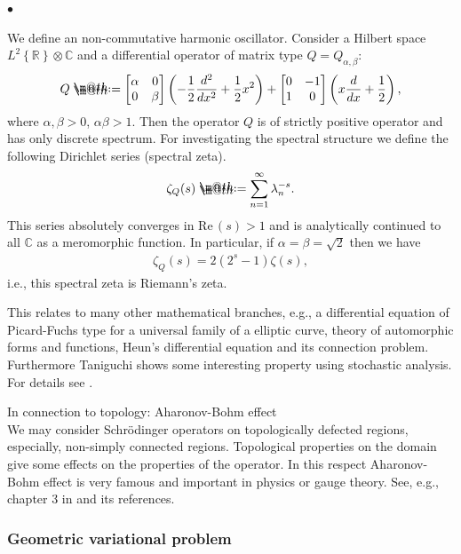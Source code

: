 \documentclass[openany, a4paper, oneside]{jsbook}
\makeatletter
\newcounter{enum2}
\renewenvironment{itemize}{%
\begin{list}{$\bullet$\ \ }%
{%
\usecounter{enum2}
\setlength{\itemindent}{0pt}%
\setlength{\leftmargin}{15pt}%
\setlength{\rightmargin}{0pt}%
\setlength{\labelsep}{0pt}%
\setlength{\labelwidth}{6pt}%
\setlength{\itemsep}{0pt}%
\setlength{\parsep}{0pt}%
\setlength{\listparindent}{0pt}%
}
}{%
\end{list}%
}
\newcommand*{\defeq}{\mathrel{\rlap{%
\raisebox{0.3ex}{$\m@th\cdot$}}%
\raisebox{-0.3ex}{$\m@th\cdot$}}%
=}
\theoremstyle{break}
\theoremstyle{breakdefn}
\renewcommand{\Re}{\mathrm{Re} \,}
\newcommand{\rbk}[1]{\left (#1\right)}
\newcommand{\cbk}[1]{\left\{#1\right\}}
\newcommand{\bbC}{\mathbb{C}}
\newcommand{\bbR}{\mathbb{R}}
\makeatother
\begin{document}
\begin{itemize}
We define an non-commutative harmonic oscillator.
Consider a Hilbert space $L^2 \cbk{\bbR} \otimes \bbC$ and
a differential operator of matrix type $Q = Q_{\alpha, \beta}$:
\begin{align}
 Q
 \defeq
 \begin{bmatrix}
  \alpha & 0 \\
  0      & \beta
 \end{bmatrix}
 \rbk{- \frac{1}{2} \frac{d^2}{dx^2} + \frac{1}{2} x^2} +
 \begin{bmatrix}
  0 & -1 \\
  1 & 0
 \end{bmatrix}
 \rbk{x \frac{d}{dx} + \frac{1}{2}},
\end{align}
where $\alpha, \beta > 0$, $\alpha \beta > 1$.
Then the operator $Q$ is of strictly positive operator and has only discrete spectrum.
For investigating the spectral structure we define the following Dirichlet series (spectral zeta).
\begin{align}
 \zeta_{Q} (s)
 \defeq
 \sum_{n=1}^{\infty} \lambda_{n}^{-s}.
\end{align}
This series absolutely converges in $\Re \rbk{s} > 1$ and
is analytically continued to all $\bbC$ as a meromorphic function.
In particular, if $\alpha = \beta = \sqrt{2}$ then we have
\begin{align}
 \zeta_{Q} (s)
 =
 2 \rbk{2^s - 1} \zeta (s),
\end{align}
i.e., this spectral zeta is Riemann's zeta.

This relates to many other mathematical branches, e.g.,
a differential equation of Picard-Fuchs type  for a universal family of a elliptic curve,
theory of automorphic forms and functions,
Heun's differential equation and its connection problem.
Furthermore Taniguchi shows some interesting property using stochastic analysis.
For details see \cite{AlbertoParmeggiani1}.

\item In connection to topology: Aharonov-Bohm effect\\
%
We may consider Schr\"odinger operators on topologically defected regions,
especially, non-simply connected regions.
Topological properties on the domain give some effects on the properties of the operator.
In this respect Aharonov-Bohm effect is very famous and important in physics or gauge theory.
See, e.g., chapter 3 in \cite{AsaoArai4} and its references.
\end{itemize} %
\subsubsection{Geometric variational problem}
\end{document}
